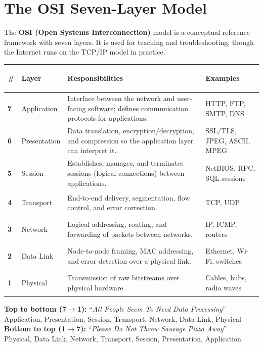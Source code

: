 \documentclass[11pt, letterpaper]{article}
\begin{document}
\section*{The OSI Seven-Layer Model}

The \textbf{OSI (Open Systems Interconnection)} model is a conceptual reference framework with seven layers. It is used for teaching and troubleshooting, though the Internet runs on the TCP/IP model in practice.

\noindent
{\renewcommand{\arraystretch}{1.6}
\begin{tabularx}{\textwidth}{>{\bfseries\centering\arraybackslash}p{1cm}
                              >{\bfseries\raggedright\arraybackslash}p{3.5cm}
                              >{\raggedright\arraybackslash}X
                              >{\raggedright\arraybackslash}p{3.6cm}}
\toprule
\rowcolor{tableheader}
\textbf{\#} & \textbf{Layer} & \textbf{Responsibilities} & \textbf{Examples} \\
\midrule
\rowcolor{rowB} 7 & Application  & Interface between the network and user-facing software; defines communication protocols for applications. & HTTP, FTP, SMTP, DNS \\
\rowcolor{rowA} 6 & Presentation & Data translation, encryption/decryption, and compression so the application layer can interpret it. & SSL/TLS, JPEG, ASCII, MPEG \\
\rowcolor{rowB} 5 & Session      & Establishes, manages, and terminates sessions (logical connections) between applications. & NetBIOS, RPC, SQL sessions \\
\rowcolor{rowA} 4 & Transport    & End-to-end delivery, segmentation, flow control, and error correction. & TCP, UDP \\
\rowcolor{rowB} 3 & Network      & Logical addressing, routing, and forwarding of packets between networks. & IP, ICMP, routers \\
\rowcolor{rowA} 2 & Data Link    & Node-to-node framing, MAC addressing, and error detection over a physical link. & Ethernet, Wi-Fi, switches \\
\rowcolor{rowB} 1 & Physical     & Transmission of raw bitstreams over physical hardware. & Cables, hubs, radio waves \\
\bottomrule
\end{tabularx}}

\vspace{4pt}
\begin{tcolorbox}[colback=notebg, colframe=noteborder, arc=3pt, boxrule=1pt,
  title={\bfseries OSI Memory Aids}]
\textbf{Top to bottom (7$\to$1):} ``\textit{All People Seem To Need Data Processing}''\\
\quad Application, Presentation, Session, Transport, Network, Data Link, Physical\\[4pt]
\textbf{Bottom to top (1$\to$7):} ``\textit{Please Do Not Throw Sausage Pizza Away}''\\
\quad Physical, Data Link, Network, Transport, Session, Presentation, Application
\end{tcolorbox}
\end{document}
